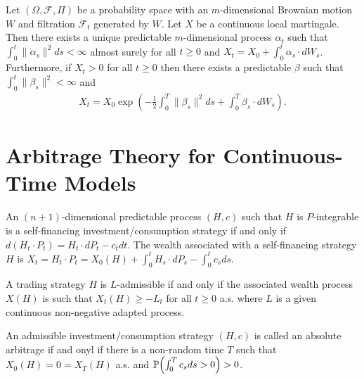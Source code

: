 \begin{thm}
  \label{sec:brown-moti-stoch-13}
  Let $(\Omega, \mathcal{F}, \Pi)$ be a probability space with an
  $m$-dimensional Brownian motion $W$ and filtration $\mathcal{F}_{t}$
  generated by $W$.  Let $X$ be a continuous local martingale. Then
  there exists a unique predictable $m$-dimensional process
  $\alpha_{t}$ such that $\int_{0}^{t} \|\alpha_{s}\|^{2} ds < \infty$
  almost surely for all $t \geq 0$ and $X_{t} = X_{0} + \int_{0}^{t}
  \alpha_{s} \cdot dW_{s}$. Furthermore, if $X_{t} > 0$ for all $t
  \geq 0$ then there exists a predictable $\beta$ such that
  $\int_{0}^{t} \| \beta_{s}\|^{2} < \infty$ and
  \begin{align}
    \label{eq:23}
    X_{t} = X_{0} \exp(-\frac{1}{2} \int_{0}^{T} \| \beta_{s}\|^{2} ds
    + \int_{0}^{T} \beta_{s} \cdot dW_{s}).
  \end{align}
\end{thm}

\section{Arbitrage Theory for Continuous-Time Models}
\label{sec:arbitr-theory-cont}

\begin{defn}
  \label{sec:arbitr-theory-cont-2}
  An $(n+1)$-dimensional predictable process $(H, c)$ such that $H$ is
  $P$-integrable is a self-financing investment/consumption strategy
  if and only if $d(H_{t} \cdot P_{t}) = H_{t} \cdot dP_{t} - c_{t}
  dt$.  The wealth associated with a self-financing strategy $H$ is
  $X_{t} = H_{t} \cdot P_{t} = X_{0}(H) + \int_{0}^{t} H_{s} \cdot
  dP_{s} - \int_{0}^{t} c_{s} ds$.
\end{defn}

\begin{defn}
  \label{sec:arbitr-theory-cont-3}
  A trading strategy $H$ is $L$-admissible if and only if the
  associated wealth process $X(H)$ is such that $X_{t}(H) \geq -L_{t}$
  for all $t \geq 0$ a.s. where $L$ is a given continuous non-negative
  adapted process.
\end{defn}

\begin{defn}
  \label{sec:arbitr-theory-cont-4}
  An admissible investment/consumption strategy $(H, c)$ is called an
  absolute arbitrage if and onyl if there is a non-random time $T$
  such that $X_{0}(H) = 0 = X_{T}(H)$ a.s. and $\Prob{\int_{0}^{T}
    c_{s} ds > 0} > 0$.
\end{defn}

